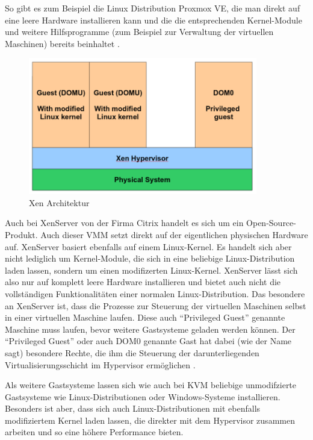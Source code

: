 So gibt es zum Beispiel die Linux Distribution Proxmox VE, die man direkt auf eine leere Hardware installieren kann und die die entsprechenden Kernel-Module und weitere Hilfsprogramme (zum Beispiel zur Verwaltung der virtuellen Maschinen) bereits beinhaltet \citep[Vgl.][]{Proxmox14}.

\begin{figure}[!ht]
  \begin{center}
    \includegraphics[width=10cm]{bilder/xen.png}
    \caption{Xen Architektur \citep{kvm:002}}
  \end{center}
\end{figure}

Auch bei XenServer von der Firma Citrix handelt es sich um ein Open-Source-Produkt. Auch dieser \ac{VMM} setzt direkt auf der eigentlichen physischen Hardware auf. XenServer basiert ebenfalls auf einem Linux-Kernel. Es handelt sich aber nicht lediglich um Kernel-Module, die sich in eine beliebige Linux-Distribution laden lassen, sondern um einen modifizerten Linux-Kernel. XenServer lässt sich also nur auf komplett leere Hardware installieren und bietet auch nicht die vollständigen Funktionalitäten einer normalen Linux-Distribution. Das besondere an XenServer ist, dass die Prozesse zur Steuerung der virtuellen Maschinen selbst in einer virtuellen Maschine laufen. Diese auch "`Privileged Guest"' genannte Maschine muss laufen, bevor weitere Gastsysteme geladen werden können. Der "`Privileged Guest"' oder auch DOM0 genannte Gast hat dabei (wie der Name sagt) besondere Rechte, die ihm die Steuerung der darunterliegenden Virtualisierungsschicht im Hypervisor ermöglichen \citep[Vgl.][S. 2]{Schee14}.

Als weitere Gastsysteme lassen sich wie auch bei KVM beliebige unmodifzierte Gastsysteme wie Linux-Distributionen oder Windows-Systeme installieren. Besonders ist aber, dass sich auch Linux-Distributionen mit ebenfalls modifiziertem Kernel laden lassen, die direkter mit dem Hypervisor zusammen arbeiten und so eine höhere Performance bieten.

